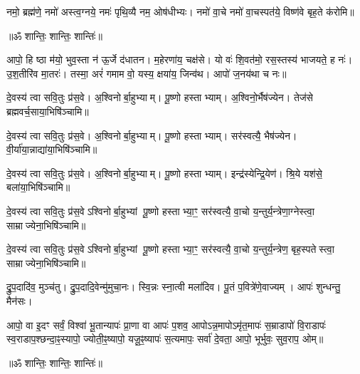 नमो॒ ब्रह्म॑णे॒ नमो॑ अस्त्व॒ग्नये॒ नमः॑ पृथि॒व्यै नम॒ ओष॑धीभ्यः।
नमो॑ वा॒चे नमो॑ वा॒चस्पत॑ये॒ विष्ण॑वे बृह॒ते क॑रोमि॥

\centerline{॥ॐ शान्तिः॒ शान्तिः॒ शान्तिः॑॥}


आपो॒ हि ष्ठा म॑यो॒ भुव॒स्ता न॑ ऊ॒र्जे द॑धातन।
म॒हेरणा॑य॒ चक्ष॑से। यो वः॑ शि॒वत॑मो॒ रस॒स्तस्य॑ भाजयते॒ ह नः॑।
उ॒श॒तीरि॑व मा॒तरः॑। तस्मा॒ अरं॑ गमाम वो॒ यस्य॒ क्षया॑य॒ जिन्व॑थ।
आपो॑ ज॒नय॑था च नः॥

दे॒वस्य॑ त्वा सवि॒तुः प्र॑स॒वे। अ॒श्विनोर्बा॒हुभ्याम्। पू॒ष्णो हस्ताभ्याम्।
अ॒श्विनो॒र्भैष॑ज्येन। तेज॑से ब्रह्मवर्च॒साया॒भिषि॑ञ्चामि॥

दे॒वस्य॑ त्वा सवि॒तुः प्र॑स॒वे। अ॒श्विनोर्बा॒हुभ्याम्। पू॒ष्णो हस्ताभ्याम्।
सर॑स्वत्यै॒ भैष॑ज्येन। वी॒र्या॑या॒न्नाद्या॑या॒भिषि॑ञ्चामि॥

दे॒वस्य॑ त्वा सवि॒तुः प्र॑स॒वे। अ॒श्विनोर्बा॒हुभ्याम्। पू॒ष्णो हस्ताभ्याम्।
इन्द्र॑स्येन्द्रि॒येण॑। श्रि॒ये यश॑से॒ बला॑या॒भिषि॑ञ्चामि॥

दे॒वस्य॑ त्वा सवि॒तुः प्र॑स॒वेऽश्विनोर्बा॒हुभ्यां पू॒ष्णो हस्ताभ्या॒ꣳ॒
सर॑स्वत्यै॒ वा॒चो य॒न्तुर्य॒न्त्रेणा॒ग्नेस्त्वा॒ साम्राज्येना॒भिषि॑ञ्चामि॥

दे॒वस्य॑ त्वा सवि॒तुः प्र॑स॒वेऽश्विनोर्बा॒हुभ्यां पू॒ष्णो हस्ताभ्या॒ꣳ॒
सर॑स्वत्यै॒ वा॒चो य॒न्तुर्य॒न्त्रेण॒ बृह॒स्पतेस्त्वा॒ साम्राज्येना॒भिषि॑ञ्चामि॥

द्रु॒प॒दादि॑व॒ मुञ्च॑तु। द्रु॒प॒दादि॒वेन्मु॑मुचा॒नः।
स्वि॒न्नः स्ना॒त्वी मला॑दिव। पू॒तं प॒वित्रे॑णे॒वाज्यम्।
आपः॑ शुन्धन्तु॒ मैन॑सः।

आपो॒ वा इ॒दꣳ सर्वं॒ विश्वा॑ भू॒तान्यापः॑ प्रा॒णा वा आपः॑ प॒शव॒ आपोऽन्न॒मापोऽमृ॑त॒मापः॑ स॒म्राडापो॑ वि॒राडापः॑ स्व॒राडाप॒श्छन्दा॒ꣴ॒स्यापो॒ ज्योती॒ꣴ॒ष्यापो॒ यजू॒ꣴ॒ष्यापः॑ स॒त्यमापः॒ सर्वा॑ दे॒वता॒ आपो॒ भूर्भुवः॒ सुव॒राप॒ ओम्॥

\centerline{॥ॐ शान्तिः॒ शान्तिः॒ शान्तिः॑॥}